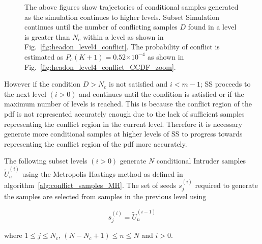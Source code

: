 \documentclass[journal]{IEEEtran}
\providecommand{\e}[1]{\ensuremath{\times 10^{#1}}}
\begin{document}
\begin{figure*}[!t]\centering
	\hfill
	\hfill
	\hfill		
	\caption{The above figures show trajectories of conditional samples generated as the simulation continues to higher levels. Subset Simulation continues until the number of conflicting samples $D$ found in a level is greater than $N_{c}$ within a level as shown in Fig.~\ref{fig:headon_level4_conflict}. The probability of conflict is estimated as $P_{c}(K+1) = 0.52\e{-4}$ as shown in Fig.~\ref{fig:headon_level4_conflict_CCDF_zoom}.}
	\label{fig:headon_level3_4}
\end{figure*}

However if the condition $D > N_{c}$ is not satisfied and $i < m-1$; SS proceeds to the next level $(i > 0)$ and continues until the condition is satisfied or if the maximum number of levels is reached. This is because the conflict region of the pdf is not represented accurately enough due to the lack of sufficient samples representing the conflict region in the current level. Therefore it is necessary generate more conditional samples at higher levels of SS to progress towards representing the conflict region of the pdf more accurately.

The following subset levels $(i > 0)$ generate $N$ conditional Intruder samples $\tilde{U}_{n}^{(i)}$ using the Metropolis Hastings method as defined in algorithm~\ref{alg:conflict_samples_MH}. The set of seeds $s_{j}^{(i)}$ required to generate the samples are selected from samples in the previous level using 

\begin {equation}
	s_{j}^{(i)} = \tilde{U}_{n}^{(i-1)}
\label{eq:seeds_app}
\end{equation}

\noindent where $1 \leq j \leq N_{c}$, $(N-N_{c}+1) \leq n \leq N$ and $i > 0$.
\end{document}
